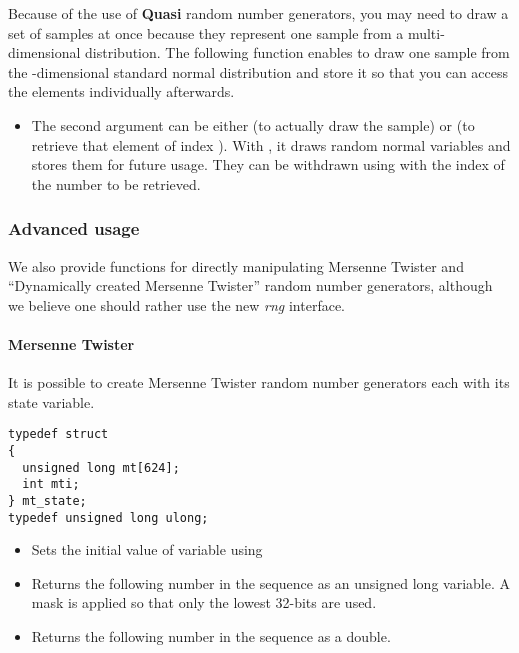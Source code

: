 Because of the use of {\bf Quasi} random number generators, you may need to
draw a set of samples at once because they represent one sample from a
multi-dimensional distribution. The following function enables to draw one
sample from the -dimensional standard normal distribution and
store it so that you can access the elements individually afterwards.
\begin{itemize}
\item {}
  \sshortdescribe The second argument can be either  (to actually
  draw the sample) or  (to retrieve that element of index
  ). With , it draws  random normal variables
  and stores them for future usage. They can be withdrawn using 
  with the index of the number to be retrieved.
\end{itemize}



\subsubsection{Advanced usage}

We also provide functions for directly manipulating Mersenne Twister and
``Dynamically created Mersenne Twister'' random number generators, although we
believe one should rather use the new {\em rng} interface.

\paragraph{Mersenne Twister}

It is possible to create Mersenne Twister random number generators each with
its state variable.
\begin{verbatim}
typedef struct
{
  unsigned long mt[624];
  int mti;
} mt_state;
typedef unsigned long ulong;
\end{verbatim}

\begin{itemize}
\item {}
  \sshortdescribe Sets the initial value of variable  using 
\item {}
  \sshortdescribe Returns the following number in the sequence as an unsigned
  long variable. A mask is applied so that only the lowest 32-bits are used.
\item {}
  \sshortdescribe Returns the following number in the sequence as a double.
\end{itemize}



